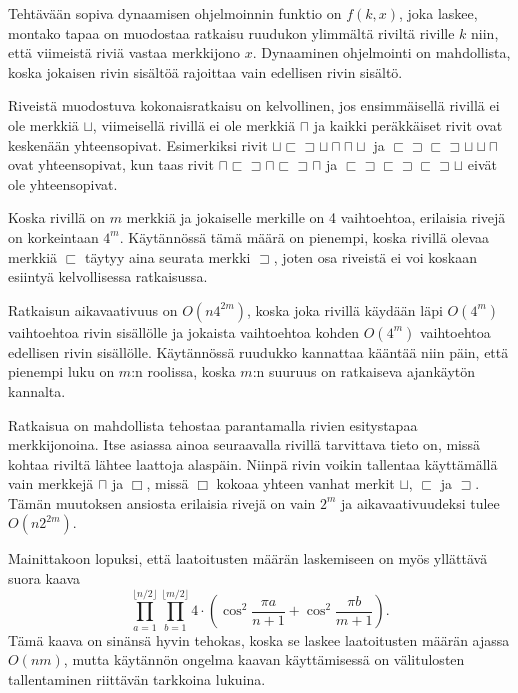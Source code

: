 Tehtävään sopiva dynaamisen ohjelmoinnin funktio on $f(k,x)$,
joka laskee, montako tapaa on muodostaa ratkaisu
ruudukon ylimmältä riviltä riville $k$ niin,
että viimeistä riviä vastaa merkkijono $x$.
Dynaaminen ohjelmointi on mahdollista,
koska jokaisen rivin sisältöä
rajoittaa vain edellisen rivin sisältö.

Riveistä muodostuva kokonaisratkaisu on kelvollinen,
jos ensimmäisellä rivillä ei ole merkkiä $\sqcup$,
viimeisellä rivillä ei ole merkkiä $\sqcap$
ja kaikki peräkkäiset rivit ovat keskenään yhteensopivat.
Esimerkiksi rivit
$\sqcup \sqsubset \sqsupset \sqcup \sqcap \sqcap \sqcup$ ja
$\sqsubset \sqsupset \sqsubset \sqsupset \sqcup \sqcup \sqcap$ 
ovat yhteensopivat,
kun taas rivit
$\sqcap \sqsubset \sqsupset \sqcap \sqsubset \sqsupset \sqcap$ ja
$\sqsubset \sqsupset \sqsubset \sqsupset \sqsubset \sqsupset \sqcup$
eivät ole yhteensopivat.

Koska rivillä on $m$ merkkiä ja jokaiselle merkille on 4
vaihtoehtoa, erilaisia rivejä on korkeintaan $4^m$.
Käytännössä tämä määrä on pienempi,
koska rivillä olevaa merkkiä $\sqsubset$
täytyy aina seurata merkki $\sqsupset$,
joten osa riveistä ei voi koskaan esiintyä
kelvollisessa ratkaisussa.

Ratkaisun aikavaativuus on $O(n 4^{2m})$,
koska joka rivillä käydään läpi $O(4^m)$
vaihtoehtoa rivin sisällölle
ja jokaista vaihtoehtoa kohden $O(4^m)$
vaihtoehtoa edellisen rivin sisällölle.
Käytännössä ruudukko kannattaa kääntää niin
päin, että pienempi luku on $m$:n roolissa,
koska $m$:n suuruus on ratkaiseva ajankäytön kannalta.

Ratkaisua on mahdollista tehostaa parantamalla rivien esitystapaa merkkijonoina.
Itse asiassa ainoa seuraavalla rivillä tarvittava tieto on,
missä kohtaa riviltä lähtee laattoja alaspäin.
Niinpä rivin voikin tallentaa käyttämällä vain merkkejä
$\sqcap$ ja $\Box$, missä $\Box$ kokoaa yhteen vanhat merkit
$\sqcup$, $\sqsubset$ ja $\sqsupset$.
Tämän muutoksen ansiosta erilaisia rivejä on vain $2^m$
ja aikavaativuudeksi tulee $O(n 2^{2m})$.

Mainittakoon lopuksi, että laatoitusten määrän laskemiseen
on myös yllättävä suora kaava
\[ \prod_{a=1}^{\lfloor n/2 \rfloor} \prod_{b=1}^{\lfloor m/2 \rfloor} 4 \cdot (\cos^2 \frac{\pi a}{n + 1} + \cos^2 \frac{\pi b}{m+1}).\]
Tämä kaava on sinänsä hyvin tehokas,
koska se laskee laatoitusten määrän ajassa $O(nm)$,
mutta käytännön ongelma kaavan käyttämisessä
on välitulosten tallentaminen riittävän tarkkoina lukuina.
